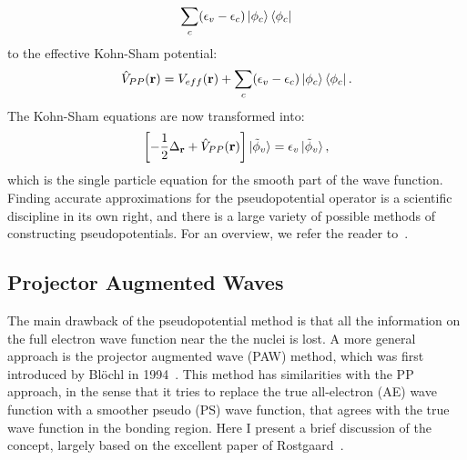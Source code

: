 \begin{refsection}
\begin{equation*}
\sum_c (\epsilon_v - \epsilon_c) \ket{\phi_c} \bra{\phi_c} 
\end{equation*} 
to the effective Kohn-Sham potential: 
\begin{equation} 
\hat{V}_{PP}(\mathbf{r}) = V_{eff}(\mathbf{r}) + \sum_c (\epsilon_v - 
\epsilon_c) \ket{\phi_c} \bra{\phi_c}. 
\end{equation} 
The Kohn-Sham equations are now transformed into: 
\begin{equation} 
\left[- \frac{1}{2} \Delta_{\mathbf{r}} + \hat{V}_{PP}(\mathbf{r}) 
\right]\ket{\tilde{\phi}_v} = \epsilon_v \ket{\tilde{\phi}_v}, 
\end{equation} 
which is the single particle equation for the smooth part of the wave 
function. Finding accurate approximations for the pseudopotential operator is 
a scientific discipline in its own right, and there is a large variety of 
possible methods of constructing pseudopotentials. For an overview, we refer 
the reader to~\cite{Singh2006}. 
 
\subsection{Projector Augmented Waves} \label{dft:sec-PAW} 
 
The main drawback of the pseudopotential method is that all the information on 
the full electron wave function near the the nuclei is 
lost. A more general approach is the projector augmented 
wave (\gls{PAW}) method, which was first introduced by Bl\"ochl in 
1994~\cite{Blochl1994}. This method has similarities with the \gls{PP} approach, in 
the sense that it tries to replace the true all-electron (\gls{AE}) wave function 
with a smoother pseudo (\gls{PS}) wave function, that agrees with the true wave 
function in the bonding region. Here I present a brief discussion of the concept,
largely based on the excellent paper of Rostgaard~\cite{Rostgaard2009}.
 

\end{refsection}
